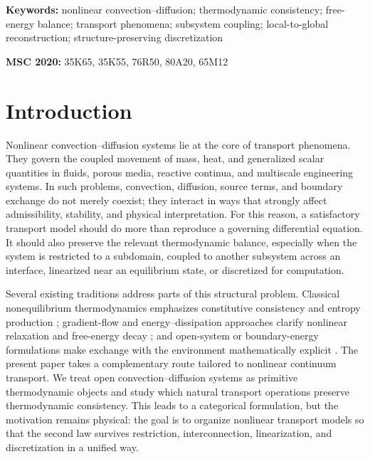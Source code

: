 \documentclass[11pt]{article}
\begin{document}
\noindent\textbf{Keywords:}
nonlinear convection--diffusion; thermodynamic consistency; free-energy balance;
transport phenomena; subsystem coupling; local-to-global reconstruction;
structure-preserving discretization

\medskip
\noindent\textbf{MSC 2020:}
35K65, 35K55, 76R50, 80A20, 65M12

\section{Introduction}

Nonlinear convection--diffusion systems lie at the core of transport phenomena. They
govern the coupled movement of mass, heat, and generalized scalar quantities in
fluids, porous media, reactive continua, and multiscale engineering systems. In such
problems, convection, diffusion, source terms, and boundary exchange do not merely
coexist; they interact in ways that strongly affect admissibility, stability, and
physical interpretation. For this reason, a satisfactory transport model should do
more than reproduce a governing differential equation. It should also preserve the
relevant thermodynamic balance, especially when the system is restricted to a
subdomain, coupled to another subsystem across an interface, linearized near an
equilibrium state, or discretized for computation.

Several existing traditions address parts of this structural problem. Classical
nonequilibrium thermodynamics emphasizes constitutive consistency and entropy
production \cite{OnsagerI,OnsagerII,deGrootMazur}; gradient-flow and
energy--dissipation approaches clarify nonlinear relaxation and free-energy decay
\cite{JKO,OttoPME,Mielke2011,GlitzkyMielke2013}; and open-system or
boundary-energy formulations make exchange with the environment mathematically
explicit \cite{vanDerSchaftMaschke,GrmelaOttingerI,GrmelaOttingerII}. The present
paper takes a complementary route tailored to nonlinear continuum transport. We treat
open convection--diffusion systems as primitive thermodynamic objects and study which
natural transport operations preserve thermodynamic consistency. This leads to a
categorical formulation, but the motivation remains physical: the goal is to organize
nonlinear transport models so that the second law survives restriction,
interconnection, linearization, and discretization in a unified way.
\end{document}
